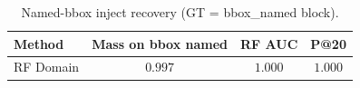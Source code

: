 \begin{table}[ht]
\centering
\caption{Named-bbox inject recovery (GT = bbox\_named block).}
\label{tab:bbox-named-inject}
\small
\begin{tabular}{@{}l ccc@{}}
\toprule
Method & Mass on bbox named & RF AUC & P@20 \\
\midrule
RF Domain & $0.997$ & $1.000$ & $1.000$ \\
\bottomrule
\end{tabular}
\end{table}
